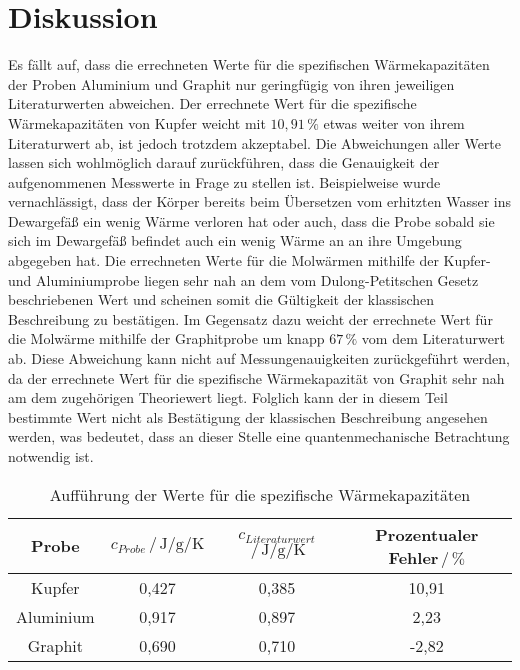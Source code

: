 \section{Diskussion}
\label{sec:Diskussion}

Es fällt auf, dass die errechneten Werte für die spezifischen Wärmekapazitäten der Proben 
Aluminium und Graphit nur geringfügig von ihren jeweiligen Literaturwerten abweichen. Der 
errechnete Wert für die spezifische Wärmekapazitäten von Kupfer weicht mit $10,91\,\%$ etwas
weiter von ihrem Literaturwert ab, ist jedoch trotzdem akzeptabel. Die Abweichungen aller Werte 
lassen sich wohlmöglich darauf zurückführen, dass die Genauigkeit der aufgenommenen Messwerte in 
Frage zu stellen ist. Beispielweise wurde vernachlässigt, dass der Körper bereits beim Übersetzen
vom erhitzten Wasser ins Dewargefäß ein wenig Wärme verloren hat oder auch, dass die Probe sobald 
sie sich im Dewargefäß befindet auch ein wenig Wärme an an ihre Umgebung abgegeben hat. Die 
errechneten Werte für die Molwärmen mithilfe der Kupfer- und Aluminiumprobe liegen sehr nah an 
dem vom Dulong-Petitschen Gesetz beschriebenen Wert und scheinen somit die Gültigkeit der 
klassischen Beschreibung zu bestätigen. Im Gegensatz dazu weicht der errechnete Wert für die 
Molwärme mithilfe der Graphitprobe um knapp $67\, \%$ vom dem Literaturwert ab. Diese Abweichung
kann nicht auf Messungenauigkeiten zurückgeführt werden, da der errechnete Wert für die 
spezifische Wärmekapazität von Graphit sehr nah am dem zugehörigen Theoriewert liegt.
Folglich kann der in diesem Teil bestimmte Wert nicht als Bestätigung der klassischen Beschreibung
angesehen werden, was bedeutet, dass an dieser Stelle eine quantenmechanische Betrachtung 
notwendig ist.





\begin{table}[h]
\normalsize

\centering
{}
\begin{tabular}{c c c c}
\toprule
        Probe & $c_{Probe} \,/\, \si{\joule\per\gram\per\kelvin}$ & $ c_{Literaturwert} $\cite{stocker2004taschenbuch}$\,/\, \si{\joule\per\gram\per\kelvin}$ & Prozentualer Fehler$\,/\, \% $\\
        \midrule
        Kupfer      &   0,427   &   0,385   &   10,91\\
        Aluminium   &   0,917   &   0,897   &    2,23\\
        Graphit     &   0,690   &   0,710   &   -2,82\\

\bottomrule

\end{tabular}

\caption{Aufführung der Werte für die spezifische Wärmekapazitäten}
\label{tab:werte1}
\end{table}



